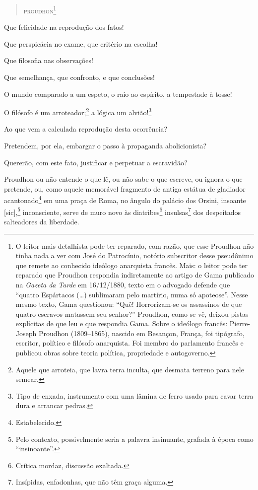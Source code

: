 {\begin{quote}
\hfill\textsc{proudhon}\footnote{O leitor mais detalhista pode ter reparado, com razão, que esse Proudhon não tinha nada a ver com José do
  Patrocínio, notório subscritor desse pseudônimo que remete ao
  conhecido ideólogo anarquista francês. Mais: o leitor pode ter
  reparado que Proudhon respondia indiretamente ao artigo de Gama
  publicado na \emph{Gazeta da Tarde} em 16/12/1880, texto em o advogado
  defende que ``quatro Espártacos (\ldots{}) sublimaram pelo martírio, numa só
  apoteose''. Nesse mesmo texto, Gama questionou: ``Quê! Horrorizam-se os
  assassinos de que quatro escravos matassem seu senhor?''
  Proudhon, como se vê, deixou pistas explícitas de que leu e que
  respondia Gama. Sobre o ideólogo francês: Pierre-Joseph Proudhon \label{proudhon}
  (1809--1865), nascido em Besançon, França, foi tipógrafo, escritor,
  político e filósofo anarquista. Foi membro do parlamento francês e
  publicou obras sobre teoria política, propriedade e autogoverno.}
\end{quote}

\asterisc

Que felicidade na reprodução dos fatos!

Que perspicácia no exame, que critério na escolha!

Que filosofia nas observações!

Que semelhança, que confronto, e que conclusões!

O mundo comparado a um espeto, o raio ao espírito, a tempestade à tosse!

O filósofo é um arroteador;\footnote{Aquele que arroteia, que lavra
  terra inculta, que desmata terreno para nele semear.} a lógica um
alvião!\footnote{Tipo de enxada, instrumento com uma lâmina de ferro
  usado para cavar terra dura e arrancar pedras.}

Ao que vem a calculada reprodução desta ocorrência?

Pretendem, por ela, embargar o passo à propaganda abolicionista?

Quererão, com este fato, justificar e perpetuar a escravidão?

Proudhon ou não entende o que lê, ou não sabe o que escreve, ou
ignora o que pretende, ou, como aquele memorável fragmento de antiga
estátua de gladiador acantonado\footnote{Estabelecido.} em uma praça
de Roma, no ângulo do palácio dos Orsini, insoante {[}sic{]},\footnote{
  Pelo contexto, possivelmente seria a palavra insinuante, grafada à
  época como ``insinoante''.} inconsciente, serve de muro novo às
diatribes\footnote{Crítica mordaz, discussão exaltada.}
insulsas\footnote{Insípidas, enfadonhas, que não têm graça alguma.}
dos despeitados salteadores da liberdade.

}
